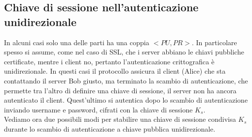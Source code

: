 \subsection{Chiave di sessione nell'autenticazione unidirezionale}
In alcuni casi solo una delle parti ha una coppia $<PU, PR>$. In particolare spesso si assume, come nel caso di SSL, che i server abbiano le chiavi pubbliche certificate, mentre i client no, pertanto l'autenticazione crittografica è unidirezionale. In questi casi il protocollo assicura il client (Alice) che sta contattando il server Bob giusto, ma terminato la scambio di autenticazione, che permette tra l'altro di definire una chiave di sessione, il server non ha ancora autenticato il client. Quest'ultimo si autentica dopo lo scambio di autenticazione inviando username e password, cifrati con la chiave di sessione $K_{s}$.\\ 
Vediamo ora due possibili modi per stabilire una chiave di sessione condivisa $K_{s}$ durante lo scambio di autenticazione a chiave pubblica unidirezionale.\\ \\
